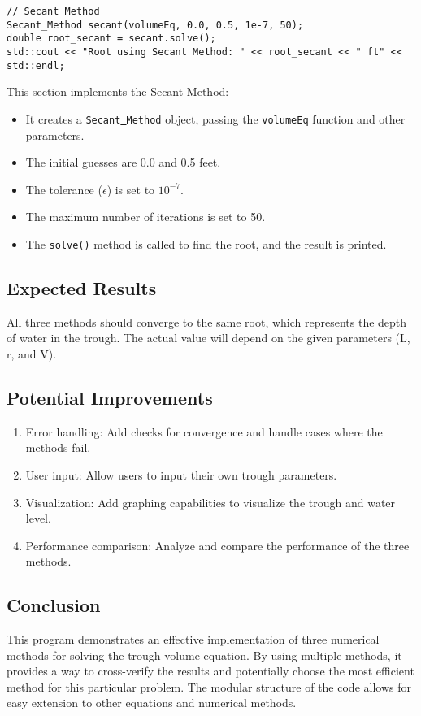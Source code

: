 \documentclass{article}
\begin{document}
\begin{lstlisting}
// Secant Method
Secant_Method secant(volumeEq, 0.0, 0.5, 1e-7, 50);
double root_secant = secant.solve();
std::cout << "Root using Secant Method: " << root_secant << " ft" << std::endl;
\end{lstlisting}
This section implements the Secant Method:
\begin{itemize}
\item It creates a \texttt{Secant\underline{~}Method} object, passing the \texttt{volumeEq} function and other parameters.
\item The initial guesses are 0.0 and 0.5 feet.
\item The tolerance ($\epsilon$) is set to $10^{-7}$.
\item The maximum number of iterations is set to 50.
\item The \texttt{solve()} method is called to find the root, and the result is printed.
\end{itemize}


\subsection{Expected Results}
All three methods should converge to the same root, which represents the depth of water in the trough. The actual value will depend on the given parameters (L, r, and V).
\subsection{Potential Improvements}
\begin{enumerate}
\item Error handling: Add checks for convergence and handle cases where the methods fail.
\item User input: Allow users to input their own trough parameters.
\item Visualization: Add graphing capabilities to visualize the trough and water level.
\item Performance comparison: Analyze and compare the performance of the three methods.
\end{enumerate}
\subsection{Conclusion}
This program demonstrates an effective implementation of three numerical methods for solving the trough volume equation. By using multiple methods, it provides a way to cross-verify the results and potentially choose the most efficient method for this particular problem. The modular structure of the code allows for easy extension to other equations and numerical methods.
\end{document}
